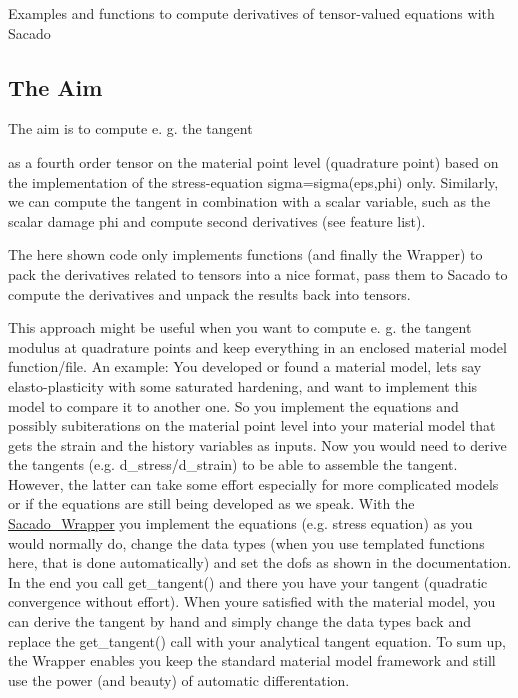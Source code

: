 Examples and functions to compute derivatives of tensor-\/valued equations with Sacado

\subsection*{The Aim}

The aim is to compute e. g. the tangent

\href{https://www.codecogs.com/eqnedit.php?latex=\overset{4}{C}&space;=&space;\frac{\partial\boldsymbol{\sigma}}{\partial\boldsymbol{\varepsilon&space;}}}{\tt }

as a fourth order tensor on the material point level (quadrature point) based on the implementation of the stress-\/equation sigma=sigma(eps,phi) only. Similarly, we can compute the tangent in combination with a scalar variable, such as the scalar damage phi and compute second derivatives (see feature list).

The here shown code only implements functions (and finally the Wrapper) to pack the derivatives related to tensors into a nice format, pass them to Sacado to compute the derivatives and unpack the results back into tensors.

This approach might be useful when you want to compute e. g. the tangent modulus at quadrature points and keep everything in an enclosed material model function/file. An example\+: You developed or found a material model, lets say elasto-\/plasticity with some saturated hardening, and want to implement this model to compare it to another one. So you implement the equations and possibly subiterations on the material point level into your material model that gets the strain and the history variables as inputs. Now you would need to derive the tangents (e.\+g. d\+\_\+stress/d\+\_\+strain) to be able to assemble the tangent. However, the latter can take some effort especially for more complicated models or if the equations are still being developed as we speak. With the \hyperlink{namespaceSacado__Wrapper}{Sacado\+\_\+\+Wrapper} you implement the equations (e.\+g. stress equation) as you would normally do, change the data types (when you use templated functions here, that is done automatically) and set the dofs as shown in the documentation. In the end you call get\+\_\+tangent() and there you have your tangent (quadratic convergence without effort). When you\textquotesingle{}re satisfied with the material model, you can derive the tangent by hand and simply change the data types back and replace the get\+\_\+tangent() call with your analytical tangent equation. To sum up, the Wrapper enables you keep the standard material model framework and still use the power (and beauty) of automatic differentation.

